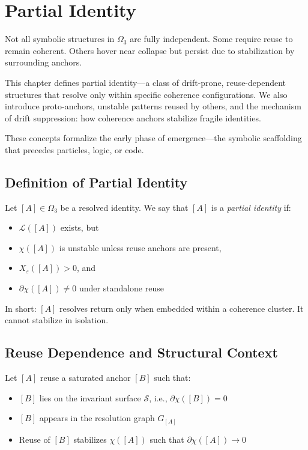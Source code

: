 \chapter{Partial Identity}

Not all symbolic structures in $\Omega_3$ are fully independent. Some require
reuse to remain coherent. Others hover near collapse but persist due to
stabilization by surrounding anchors.

This chapter defines partial identity---a class of drift-prone,
reuse-dependent structures that resolve only within specific coherence
configurations. We also introduce proto-anchors, unstable patterns
reused by others, and the mechanism of drift suppression: how coherence
anchors stabilize fragile identities.

These concepts formalize the early phase of emergence---the symbolic
scaffolding that precedes particles, logic, or code.

\section{Definition of Partial Identity} \label{definition-of-partial-identity}

\begin{definition} \label{def:partial-identity}
Let $[A] \in \Omega_3$ be a resolved identity.  
We say that $[A]$ is a \emph{partial identity} if:
\begin{itemize}
  \item $\mathcal{L}([A])$ exists, but
  \item $\chi([A])$ is unstable unless reuse anchors are present,
  \item $X_\varepsilon([A]) > 0$, and
  \item $\partial \chi([A]) \ne 0$ under standalone reuse
\end{itemize}
In short: $[A]$ resolves return only when embedded within a coherence cluster.  
It cannot stabilize in isolation.
\end{definition}

\section{Reuse Dependence and Structural Context} \label{reuse-dependence-and-structural-context}

Let $[A]$ reuse a saturated anchor $[B]$ such that:

\begin{itemize}
  \item $[B]$ lies on the invariant surface $\mathcal{S}$, i.e., $\partial \chi([B]) = 0$
  \item $[B]$ appears in the resolution graph $G_{[A]}$
  \item Reuse of $[B]$ stabilizes $\chi([A])$ such that $\partial \chi([A]) \rightarrow 0$
\end{itemize}

